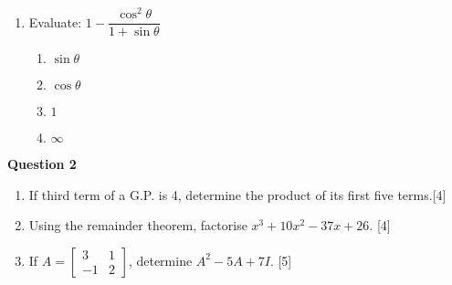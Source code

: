 \begin{enumerate}[label=(\roman*)]
    \item Evaluate: $1 - \dfrac{\cos^2 \theta}{1 + \sin \theta}$

        \begin{multicols}{2}
        \begin{enumerate}[label=(\alph*)]
            \item $\sin \theta$
            \item $\cos \theta$
            \item $1$
            \item $\infty$
        \end{enumerate}
        \end{multicols}

\end{enumerate}

\par
\noindent
\textbf{Question 2}\\
\begin{enumerate}[label=(\roman*)]

    \item If third term of a G.P. is 4, determine the product of its 
        first five terms.\hfill [4]

    \item Using the remainder theorem, factorise $x^3 + 10x^2 - 37x + 26$. 
        \hfill [4]

    \item If $A = \begin{bmatrix*} 3 & 1 \\ -1 & 2 \end{bmatrix*}$,
        determine $A^2 - 5A + 7I$. \hfill [5]

\end{enumerate}

